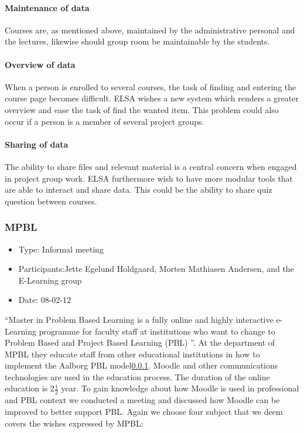 \paragraph{Maintenance of data} Courses are, as mentioned above, maintained by the administrative personal and the lectures, likewise should group room be maintainable by the students. 
\paragraph{Overview of data} When a person is enrolled to several courses, the task of finding and entering the course page becomes difficult. 
ELSA wishes a new system which renders a greater overview and ease the task of find the wanted item. 
This problem could also occur if a person is a member of several project groups.
\paragraph{Sharing of data} The ability to share files and relevant material is a central concern when engaged in project group work. ELSA furthermore wish to have more modular tools that are able to interact and share data.
This could be the ability to share quiz question between courses. 


\subsubsection{MPBL}
\begin{itemize}
	\item Type: Informal meeting
	\item Participants:Jette Egelund Holdgaard, Morten Mathiasen Andersen, and the E-Learning group
	\item Date: 08-02-12
\end{itemize}
``Master in Problem Based Learning is a fully online and highly interactive e-Learning programme for faculty staff at institutions who want to change to Problem Based and Project Based Learning (PBL) ''\cite{mpbl}.
At the department of MPBL they educate staff from other educational institutions in how to implement the Aalborg PBL model\ref{}. Moodle and other communications technologies are used in the education process. 
The duration of the online education is 2$\frac{1}{2}$ year.
To gain knowledge about how Moodle is used in professional and PBL context we conducted a meeting and discussed how Moodle can be improved to better support PBL. Again we choose four subject that we deem covers the wishes expressed by MPBL:

